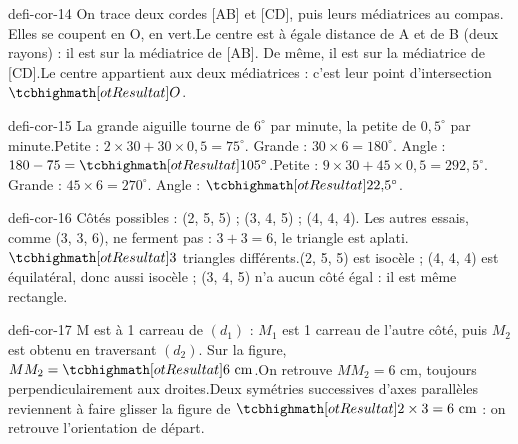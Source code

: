 \begin{blocEdition}{defi-cor-14}
On trace deux cordes [AB] et [CD], puis leurs médiatrices au compas. Elles se coupent en O, en vert.Le centre est à égale distance de A et de B (deux rayons) : il est sur la médiatrice de [AB]. De même, il est sur la médiatrice de [CD].Le centre appartient aux deux médiatrices : c’est leur point d’intersection $\res O$.\label{fig-defi-cor-14}

\end{blocEdition}
\begin{blocEdition}{defi-cor-15}
La grande aiguille tourne de $6^\circ$ par minute, la petite de $0{,}5^\circ$ par minute.Petite : $2\times30+30\times0{,}5=75^\circ$. Grande : $30\times6=180^\circ$. Angle : $180-75=\res{105^\circ}$.Petite : $9\times30+45\times0{,}5=292{,}5^\circ$. Grande : $45\times6=270^\circ$. Angle : $\res{22{,}5^\circ}$.
\end{blocEdition}
\begin{blocEdition}{defi-cor-16}
Côtés possibles : (2, 5, 5) ; (3, 4, 5) ; (4, 4, 4). Les autres essais, comme (3, 3, 6), ne ferment pas : $3+3=6$, le triangle est aplati.$\res3$ triangles différents.(2, 5, 5) est isocèle ; (4, 4, 4) est équilatéral, donc aussi isocèle ; (3, 4, 5) n’a aucun côté égal : il est même rectangle.
\end{blocEdition}
\begin{blocEdition}{defi-cor-17}
M est à 1 carreau de $(d_1)$ : $M_1$ est 1 carreau de l’autre côté, puis $M_2$ est obtenu en traversant $(d_2)$. Sur la figure, $MM_2=\res{6\ \mathrm{cm}}$.On retrouve $MM_2=6$ cm, toujours perpendiculairement aux droites.Deux symétries successives d’axes parallèles reviennent à faire glisser la figure de $\res{2\times3=6\ \mathrm{cm}}$ : on retrouve l’orientation de départ.\label{fig-defi-cor-17}

\end{blocEdition}
